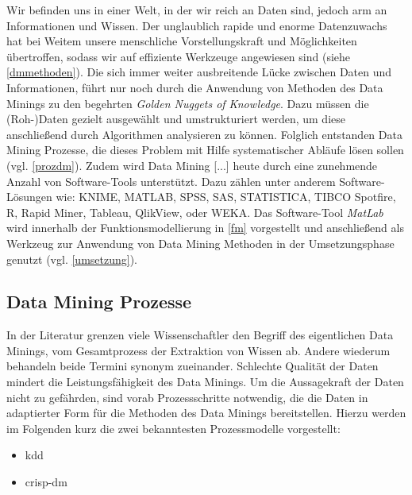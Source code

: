 \glqq Wir befinden uns in einer Welt, in der wir reich an Daten sind, jedoch arm an Informationen und Wissen.\grqq{} Der unglaublich rapide und enorme Datenzuwachs hat bei Weitem unsere menschliche Vorstellungskraft und Möglichkeiten übertroffen, sodass wir auf effiziente Werkzeuge angewiesen sind (siehe \vref{dmmethoden}). Die sich immer weiter ausbreitende Lücke zwischen Daten und Informationen, führt nur noch durch die Anwendung von Methoden des Data Minings zu den begehrten \glqq \textit{Golden Nuggets of Knowledge}\grqq. Dazu müssen die (Roh-)Daten gezielt ausgewählt und umstrukturiert werden, um diese anschließend durch Algorithmen analysieren zu können. Folglich entstanden Data Mining Prozesse, die dieses Problem mit Hilfe systematischer Abläufe lösen sollen (vgl. \vref{prozdm}). Zudem wird \glqq Data Mining [...] heute durch eine zunehmende Anzahl von Software-Tools unterstützt. Dazu zählen unter anderem Software-Lösungen wie: KNIME, MATLAB, SPSS, SAS, STATISTICA, TIBCO Spotfire, R, Rapid Miner, Tableau, QlikView, oder WEKA.\grqq{} Das Software-Tool \textit{MatLab} wird innerhalb der Funktionsmodellierung in \vref{fm} vorgestellt und anschließend als Werkzeug zur Anwendung von Data Mining Methoden in der Umsetzungsphase genutzt (vgl. \vref{umsetzung}).


\subsection{Data Mining Prozesse}
\label{prozdm}

In der Literatur grenzen viele Wissenschaftler den Begriff des eigentlichen Data Minings, vom Gesamtprozess der Extraktion von Wissen ab. Andere wiederum behandeln beide Termini synonym zueinander. Schlechte Qualität der Daten mindert die Leistungsfähigkeit des Data Minings. Um die Aussagekraft der Daten nicht zu gefährden, sind vorab Prozessschritte notwendig, die die Daten in adaptierter Form für die Methoden des Data Minings bereitstellen. Hierzu werden im Folgenden kurz die zwei bekanntesten Prozessmodelle vorgestellt:

\begin{itemize}
\item \gls{kdd}
\item \gls{crisp-dm}
\end{itemize}

